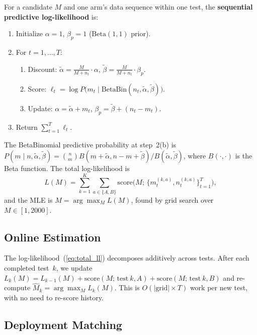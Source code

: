 \documentclass{article}
\theoremstyle{plain}
\theoremstyle{definition}
\theoremstyle{remark}
\begin{document}
For a candidate $M$ and one arm's data sequence within one test, the \textbf{sequential predictive log-likelihood} is:
\begin{enumerate}[itemsep=2pt]
\item Initialize $\alpha = 1$, $\beta_p = 1$ \quad ($\mathrm{Beta}(1,1)$ prior).
\item For $t = 1, \ldots, T$:
  \begin{enumerate}
    \item Discount: $\tilde\alpha = \frac{M}{M + n_t} \cdot \alpha$, \; $\tilde\beta = \frac{M}{M + n_t} \cdot \beta_p$.
    \item Score: $\ell_t = \log P\bigl(m_t \mid \mathrm{BetaBin}(n_t, \tilde\alpha, \tilde\beta)\bigr)$.
    \item Update: $\alpha = \tilde\alpha + m_t$, \; $\beta_p = \tilde\beta + (n_t - m_t)$.
  \end{enumerate}
\item Return $\sum_{t=1}^T \ell_t$.
\end{enumerate}
The BetaBinomial predictive probability at step~2(b) is $P(m \mid n, \tilde\alpha, \tilde\beta) = \binom{n}{m} B(m + \tilde\alpha, n - m + \tilde\beta) / B(\tilde\alpha, \tilde\beta)$, where $B(\cdot, \cdot)$ is the Beta function. The total log-likelihood is
\begin{equation}
    L(M) = \sum_{k=1}^K \sum_{a \in \{A, B\}} \mathrm{score}\bigl(M;\, \{m_t^{(k,a)}, n_t^{(k,a)}\}_{t=1}^T\bigr),
    \label{eq:total_ll}
\end{equation}
and the MLE is $\hat{M} = \arg\max_M L(M)$, found by grid search over $M \in [1, 2000]$.

\subsection{Online Estimation}

The log-likelihood~(\ref{eq:total_ll}) decomposes additively across tests. After each completed test~$k$, we update $L_k(M) = L_{k-1}(M) + \mathrm{score}(M;\, \text{test}~k, A) + \mathrm{score}(M;\, \text{test}~k, B)$ and re-compute $\hat{M}_k = \arg\max_M L_k(M)$. This is $O(|\text{grid}| \times T)$ work per new test, with no need to re-score history.

\subsection{Deployment Matching}
\end{document}
